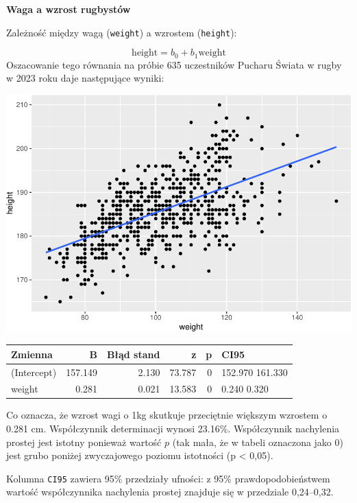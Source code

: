 \documentclass[
  openany]{book}
\begin{document}
\begin{example}
\textbf{Waga a wzrost rugbystów}

Zależność między wagą (\texttt{weight}) a wzrostem (\texttt{height}):

\[ \textrm{height} = b_0 + b_1 \textrm{weight}\]
Oszacowanie tego równania na próbie 635 uczestników
Pucharu Świata w rugby w 2023 roku
daje następujące wyniki:

\includegraphics{_main_files/figure-latex/unnamed-chunk-61-1.pdf}

\begin{tabular}{l|r|r|r|r|l}
\hline
Zmienna & B & Błąd stand & z & p & CI95\\
\hline
(Intercept) & 157.149 & 2.130 & 73.787 & 0 & 152.970 161.330\\
\hline
weight & 0.281 & 0.021 & 13.583 & 0 & 0.240 0.320\\
\hline
\end{tabular}

Co oznacza, że wzrost wagi o 1kg
skutkuje przeciętnie większym wzrostem o 0.281 cm. Współczynnik determinacji
wynosi 23.16\%.
Współczynnik nachylenia prostej jest istotny ponieważ wartość \(p\) (tak mała, że w tabeli
oznaczona jako 0)
jest grubo poniżej zwyczajowego poziomu istotności (p \textless{} 0,05).

Kolumna \texttt{CI95} zawiera 95\% przedziały ufności: z 95\% prawdopodobieństwem wartość współczynnika nachylenia
prostej znajduje się w przedziale 0,24--0,32.
\end{example}
\end{document}

